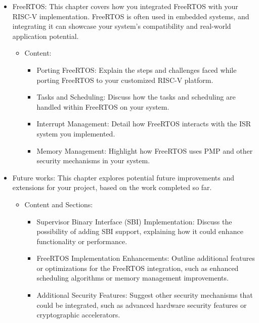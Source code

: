 \begin{itemize}
  \item FreeRTOS: This chapter covers how you integrated FreeRTOS with your RISC-V
    implementation. FreeRTOS is often used in embedded systems, and integrating
    it can showcase your system’s compatibility and real-world application
    potential.
    \begin{itemize}
      \item Content:
        \begin{itemize}
          \item Porting FreeRTOS: Explain the steps and challenges faced while
            porting FreeRTOS to your customized RISC-V platform.

          \item Tasks and Scheduling: Discuss how the tasks and scheduling are
            handled within FreeRTOS on your system.

          \item Interrupt Management: Detail how FreeRTOS interacts with the ISR
            system you implemented.

          \item Memory Management: Highlight how FreeRTOS uses PMP and other
            security mechanisms in your system.
        \end{itemize}
    \end{itemize}

  \item Future works: This chapter explores potential future improvements and
    extensions for your project, based on the work completed so far.
    \begin{itemize}
      \item Content and Sections:

        \begin{itemize}
          \item Supervisor Binary Interface (SBI) Implementation: Discuss the
            possibility of adding SBI support, explaining how it could enhance functionality
            or performance.

          \item FreeRTOS Implementation Enhancements: Outline additional
            features or optimizations for the FreeRTOS integration, such as enhanced
            scheduling algorithms or memory management improvements.

          \item Additional Security Features: Suggest other security mechanisms
            that could be integrated, such as advanced hardware security features
            or cryptographic accelerators.
        \end{itemize}
    \end{itemize}


\end{itemize}
